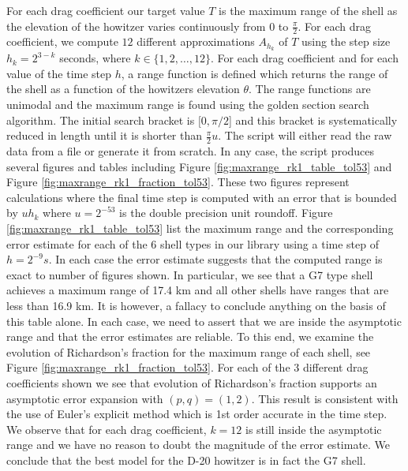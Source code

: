 \documentclass[runningheads]{llncs}
\begin{document}
For each drag coefficient our target value $T$ is the maximum range of the shell as the elevation of the howitzer varies continuously from $0$ to $\frac{\pi}{2}$. For each drag coefficient, we compute $12$ different approximations $A_{h_k}$ of $T$ using the step size $h_k = 2^{3-k}$ seconds, where $k \in \{1,2,\dots,12\}$.
For each drag coefficient and for each value of the time step $h$, a range function is defined which returns the range of the shell as a function of the howitzers elevation $\theta$.
The range functions are unimodal and the maximum range is found using the golden section search algorithm.
The initial search bracket is $[0,\pi/2$] and this bracket is systematically reduced in length until it is shorter than $\frac{\pi}{2}u$.
The script will either read the raw data from a file or generate it from scratch. In any case, the script produces several figures and tables including Figure \ref{fig:maxrange_rk1_table_tol53} and Figure \ref{fig:maxrange_rk1_fraction_tol53}. These two figures represent calculations where the final time step is computed with an error that is bounded by $u h_{k}$ where $u = 2^{-53}$ is the double precision unit roundoff. Figure \ref{fig:maxrange_rk1_table_tol53} list the maximum range and the corresponding error estimate for each of the 6 shell types in our library using a time step of $h = 2^{-9} s$. In each case the error estimate suggests that the computed range is exact to number of figures shown. In particular, we see that a G7 type shell achieves a maximum range of 17.4 km and all other shells have ranges that are less than 16.9 km. It is however, a fallacy to conclude anything on the basis of this table alone. In each case, we need to assert that we are inside the asymptotic range and that the error estimates are reliable. To this end, we examine the evolution of Richardson's fraction for the maximum range of each shell, see Figure \ref{fig:maxrange_rk1_fraction_tol53}. For each of the 3 different drag coefficients shown we see that evolution of Richardson's fraction supports an asymptotic error expansion with $(p,q) = (1,2)$. This result is consistent with the use of Euler's explicit method which is 1st order accurate in the time step. We observe that for each drag coefficient, $k=12$ is still inside the asymptotic range and we have no reason to doubt the magnitude of the error estimate. We conclude that the best model for the D-20 howitzer is in fact the G7 shell.
\end{document}
